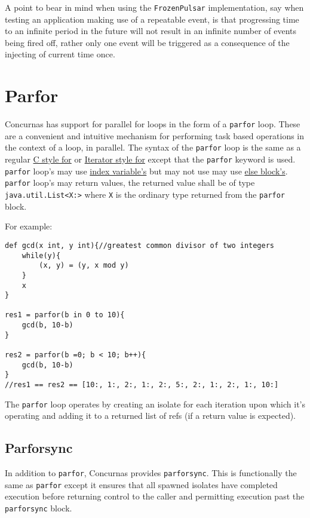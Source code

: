 \documentclass[conc-doc]{subfiles}
\begin{document}
A point to bear in mind when using the \lstinline{FrozenPulsar} implementation, say when testing an application making use of a repeatable event, is that progressing time to an infinite period in the future will not result in an infinite number of events being fired off, rather only one event will be triggered as a consequence of the injecting of current time once.





\section{Parfor}
Concurnas has support for parallel for loops in the form of a \lstinline{parfor} loop. These are a convenient and intuitive mechanism for performing task based operations in the context of a loop, in parallel. The syntax of the \lstinline{parfor} loop is the same as a regular \hyperref[subsec:cstylefor]{C style for} or \hyperref[subsec:IteratorStyleFor]{Iterator style for} except that the \lstinline{parfor} keyword is used. \lstinline{parfor} loop's may use \hyperref[subsec:indexVar]{index variable's} but may not use may use \hyperref[subsec:forelseblock]{else block's}. \lstinline{parfor} loop's may return values, the returned value shall be of type \lstinline{java.util.List<X:>} where \lstinline{X} is the ordinary type returned from the \lstinline{parfor} block.

For example:

\begin{lstlisting}
def gcd(x int, y int){//greatest common divisor of two integers
	while(y){
		(x, y) = (y, x mod y)
	}
	x
}

res1 = parfor(b in 0 to 10){
	gcd(b, 10-b)
}

res2 = parfor(b =0; b < 10; b++){
	gcd(b, 10-b)
}
//res1 == res2 == [10:, 1:, 2:, 1:, 2:, 5:, 2:, 1:, 2:, 1:, 10:]
\end{lstlisting}

The \lstinline{parfor} loop operates by creating an isolate for each iteration upon which it's operating and adding it to a returned list of refs (if a return value is expected).

\subsection{Parforsync}
In addition to \lstinline{parfor}, Concurnas provides \lstinline{parforsync}. This is functionally the same as \lstinline{parfor} except it ensures that all spawned isolates have completed execution before returning control to the caller and permitting execution past the \lstinline{parforsync} block.
\end{document}
